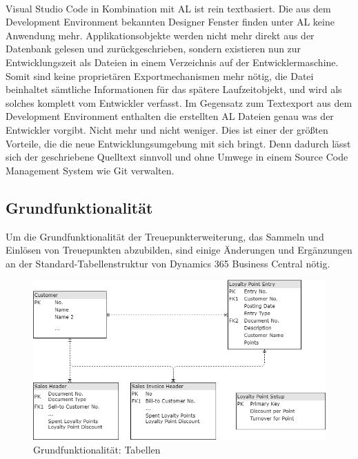 \paragraph{}
Visual Studio Code in Kombination mit AL ist rein textbasiert. Die aus dem Development Environment bekannten Designer Fenster finden unter AL keine Anwendung mehr. Applikationsobjekte werden nicht mehr direkt aus der Datenbank gelesen und zurückgeschrieben, sondern existieren nun zur Entwicklungszeit als Dateien in einem Verzeichnis auf der Entwicklermaschine. Somit sind keine proprietären Exportmechanismen mehr nötig, die Datei beinhaltet sämtliche Informationen für das spätere Laufzeitobjekt, und wird als solches komplett vom Entwickler verfasst. Im Gegensatz zum Textexport aus dem Development Environment enthalten die erstellten AL Dateien genau was der Entwickler vorgibt. Nicht mehr und nicht weniger. Dies ist einer der größten Vorteile, die die neue Entwicklungsumgebung mit sich bringt. Denn dadurch lässt sich der geschriebene Quelltext sinnvoll und ohne Umwege in einem Source Code Management System wie Git verwalten.

\pagebreak
\subsection{Grundfunktionalität}
\label{KeyFunctionality}
Um die Grundfunktionalität der Treuepunkterweiterung, das Sammeln und Einlösen von Treuepunkten abzubilden, sind einige Änderungen und Ergänzungen an der Standard-Tabellenstruktur von Dynamics 365 Business Central nötig. 

\begin{figure}[h]
	\centering
	\includegraphics[width=130mm]{images/Tables}
	\caption{Grundfunktionalität: Tabellen}
	\label{fig:Tables}
\end{figure}

